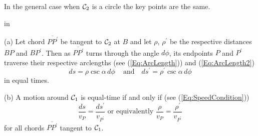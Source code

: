 \documentclass{ximera}
\newcommand{\pskip}{\vskip 0.1 in}
\begin{document}





In the general case when ${\cal C}_2$ is a circle the key points are the same. %

\pskip

(a) Let chord $\overline{PP^\prime}$ be tangent to ${\cal C}_2$ at $B$ and let $\rho$, $\rho^\prime$ be the respective distances $BP$ and $BP^\prime$. Then as $\overline{PP^\prime}$ turns through the angle $d\phi$, its endpoints $P$ and $P^\prime$ traverse their respective arclengths (see (\ref{Eq:ArcLength})) and (\ref{Eq:ArcLength2})
\begin{equation}
     ds = \rho \csc \alpha \, d\phi \,\,\,\,\, \text{ and } \,\,\,\, ds^\prime = \rho^\prime \csc \alpha \, d\phi  \label{Eq:ArcLengths2}
\end{equation}
in equal times.

(b) A motion around ${\cal C}_1$ is equal-time if and only if (see (\ref{Eq:SpeedCondition}))
\[
     \frac{ds}{v_P} = \frac{ds^\prime}{v_{P^\prime}}  \text{ or equivalently } \frac{\rho}{v_P} = \frac{\rho^\prime}{v_{P^\prime}} 
\] 
for all chords $\overline{PP^\prime}$ tangent to ${\cal C}_1$.



\end{document}
